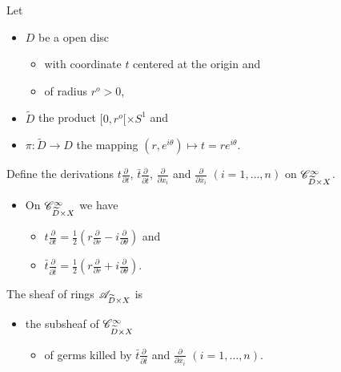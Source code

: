 Let
\begin{itemize}
  \item $D$ be a open disc
    \begin{itemize}
      \item with coordinate $t$ centered at the origin and
      \item of radius $r^o>0$,
    \end{itemize}
  \item $\tilde D$ the product $[0,r^o[\times S^1$ and
  \item $\pi: \tilde D\to D$ the mapping
    $(r,e^{i\theta})\mapsto t=re^{i\theta}$.
\end{itemize}
Define the derivations
$t\frac{\partial}{\partial t}$, $\bar t\frac{\partial}{\partial\bar t}$,
$\frac{\partial}{\partial x_i}$ and $\frac{\partial}{\partial\bar x_i}$
$(i=1,\dots,n)$ on $\mathscr{C}_{\widetilde D\times X}^\infty$.
\begin{itemize}
  \item On $\mathscr{C}_{\widetilde D\times X}^\infty$ we have
    \begin{itemize}
      \item $t\frac{\partial}{\partial t}=
              \frac{1}{2}\left(r\frac{\partial}{\partial r}
              -i\frac{\partial}{\partial\theta} \right)$ and 
      \item $\bar t\frac{\partial}{\partial\bar t}=
              \frac{1}{2}\left(r\frac{\partial}{\partial r}
              +i\frac{\partial}{\partial\theta} \right)$.
    \end{itemize}
\end{itemize}
\begin{defn}[II.5.10]
  The sheaf of rings $\mathscr{A}_{\widetilde D\times X}$ is
  \begin{itemize}
    \item the subsheaf of $\mathscr{C}_{\widetilde D\times X}^\infty$
      \begin{itemize}
        \item of germs killed by $\bar t\frac{\partial}{\partial\bar t}$ and
          $\frac{\partial}{\partial\bar x_i}$ $(i=1,\dots,n)$.
      \end{itemize}
  \end{itemize}
\end{defn}

